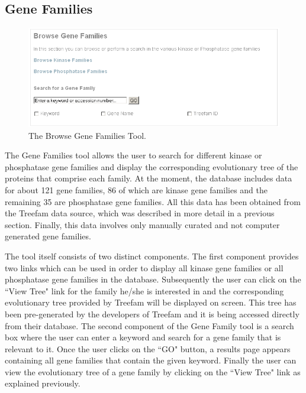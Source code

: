 \subsection{Gene Families}
\begin{figure}[htp]
\centering
\includegraphics[scale=0.6]{pictures/BrowseGeneFamilies.png}
\caption{The Browse Gene Families Tool.}
\label{browsegenefamilies}
\end{figure}
The Gene Families tool allows the user to search for different kinase or phosphatase gene families and display the corresponding evolutionary tree of the proteins that comprise each family.
At the moment, the database includes data for about 121 gene families, 86 of which are kinase gene families and the remaining 35 are phosphatase gene families.
All this data has been obtained from the Treefam data source, which was described in more detail in a previous section.
Finally, this data involves only manually curated and not computer generated gene families.

The tool itself consists of two distinct components.
The first component provides two links which can be used in order to display all kinase gene families or all phosphatase gene families in the database.
Subsequently the user can click on the ``View Tree" link for the family he/she is interested in and the corresponding evolutionary tree provided by Treefam will be displayed on screen.
This tree has been pre-generated by the developers of Treefam and it is being accessed directly from their database.
The second component of the Gene Family tool is a search box where the user can enter a keyword and search for a gene family that is relevant to it.
Once the user clicks on the ``GO" button, a results page appears containing all gene families that contain the given keyword.
Finally the user can view the evolutionary tree of a gene family by clicking on the ``View Tree" link as explained previously.
